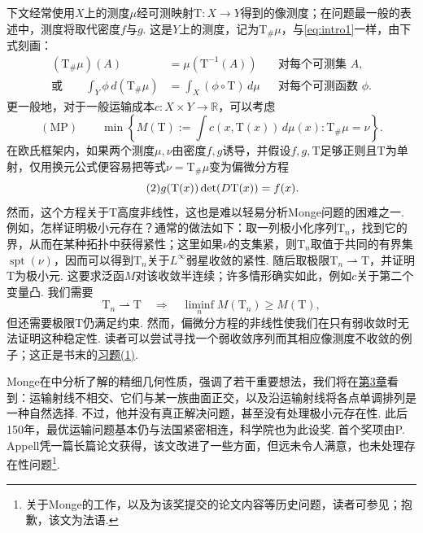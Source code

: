 下文经常使用$X$上的测度$\mu$经可测映射$\mathrm{T}:X\to Y$得到的像测度；在问题最一般的表述中，测度将取代密度$f$与$g$. 这是$Y$上的测度，记为$\mathrm{T}_\#\mu$，与\eqref{eq:intro1}一样，由下式刻画：
\begin{align*}
(\mathrm{T}_\#\mu)(A)&=\mu(\mathrm{T}^{-1}(A))&&\text{对每个可测集 }A,\\
\text{或}\qquad\int_Y\phi\,d(\mathrm{T}_\#\mu)&=\int_X(\phi\circ \mathrm{T})\,d\mu&&\text{对每个可测函数 }\phi.
\end{align*}
更一般地，对于一般运输成本$c:X\times Y\to\mathbb R$，可以考虑
\[
(\mathrm{MP})\qquad\min\left\{M(\mathrm{T}):=\int c(x,\mathrm{T}(x))\,d\mu(x):\mathrm{T}_\#\mu=\nu\right\}.
\]
在欧氏框架内，如果两个测度$\mu,\nu$由密度$f,g$诱导，并假设$f,g,\mathrm{T}$足够正则且$\mathrm{T}$为单射，仅用换元公式便容易把等式$\nu=\mathrm{T}_\#\mu$变为偏微分方程
\begin{equation}\tag{2}\label{eq:intro2}\index{D039@Jacobi行列式（determinant of the Jacobian）|hyperpage}
g(\mathrm{T}(x))\det(D\mathrm{T}(x))=f(x).
\end{equation}
然而，这个方程关于$\mathrm{T}$高度非线性，这也是难以轻易分析Monge问题的困难之一. 例如，怎样证明极小元存在？通常的做法如下：取一列极小化序列$\mathrm{T}_n$，找到它的界，从而在某种拓扑中获得紧性；这里如果$\nu$的支集紧，则$\mathrm{T}_n$取值于共同的有界集$\operatorname{spt}(\nu)$，因而可以得到$\mathrm{T}_n$关于$L^\infty$弱星收敛的紧性. 随后取极限$\mathrm{T}_n\rightharpoonup \mathrm{T}$，并证明$\mathrm{T}$为极小元. 这要求泛函$M$对该收敛半连续；许多情形确实如此，例如$c$关于第二个变量凸. 我们需要
\[
\mathrm{T}_n\rightharpoonup \mathrm{T}\quad\Longrightarrow\quad\liminf_n M(\mathrm{T}_n)\geq M(\mathrm{T}),
\]
但还需要极限$\mathrm{T}$仍满足约束. 然而，偏微分方程的非线性使我们在只有弱收敛时无法证明这种稳定性. 读者可以尝试寻找一个弱收敛序列而其相应像测度不收敛的例子；这正是书末的\hyperref[ex:1]{习题(1)}.

Monge在\cite{b239}中分析了解的精细几何性质，强调了若干重要想法，我们将在\hyperref[sec:3]{第3章}看到：运输射线不相交、它们与某一族曲面正交，以及沿运输射线将各点单调排列是一种自然选择. 不过，他并没有真正解决问题，甚至没有处理极小元存在性. 此后150年，最优运输问题基本仍与法国紧密相连，科学院也为此设奖. 首个奖项由P. Appell凭一篇长篇论文\cite{b21}获得，该文改进了一些方面，但远未令人满意，也未处理存在性问题\footnote{关于Monge的工作，以及为该奖提交的论文内容等历史问题，读者可参见\cite{b181}；抱歉，该文为法语.}.

